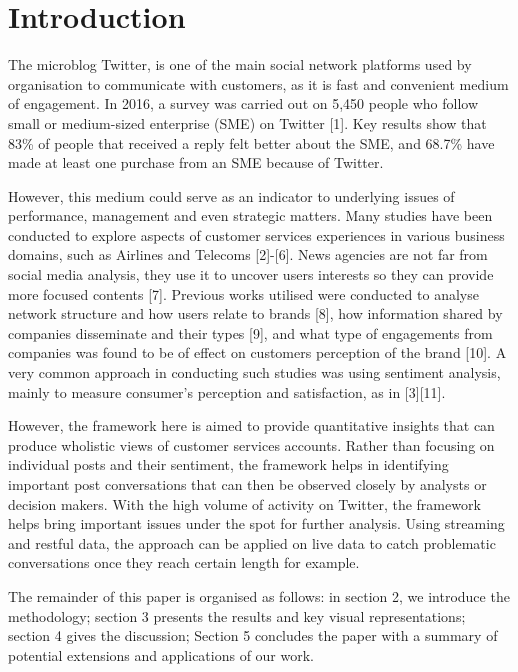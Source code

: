 \documentclass[sigconf]{acmart}
\begin{document}
\section{Introduction}\label{intro}

The microblog Twitter, is one of the main social network platforms
used by organisation to communicate with customers, as it is fast and
convenient medium of engagement. In 2016, a survey was carried out on
5,450 people who follow small or medium-sized enterprise (SME) on
Twitter [1]. Key results show that 83\% of people that received a
reply felt better about the SME, and 68.7\% have made at least one
purchase from an SME because of Twitter.

However, this medium could serve as an indicator to underlying issues
of performance, management and even strategic matters. Many studies
have been conducted to explore aspects of customer services
experiences in various business domains, such as Airlines and Telecoms
[2]-[6]. News agencies are not far from social media analysis, they
use it to uncover users interests so they can provide more focused
contents [7].  Previous works utilised were conducted to analyse
network structure and how users relate to brands [8], how information
shared by companies disseminate and their types [9], and what type of
engagements from companies was found to be of effect on customers
perception of the brand [10]. A very common approach in conducting
such studies was using sentiment analysis, mainly to measure
consumer's perception and satisfaction, as in [3][11].

However, the framework here is aimed to provide quantitative insights
that can produce wholistic views of customer services accounts. Rather
than focusing on individual posts and their sentiment, the framework
helps in identifying important post conversations that can then be
observed closely by analysts or decision makers. With the high volume
of activity on Twitter, the framework helps bring important issues
under the spot for further analysis. Using streaming and restful data,
the approach can be applied on live data to catch problematic
conversations once they reach certain length for example.

The remainder of this paper is organised as follows: in section 2, we
introduce the methodology; section 3 presents the results and key
visual representations; section 4 gives the discussion; Section 5
concludes the paper with a summary of potential extensions and
applications of our work.
\end{document}
